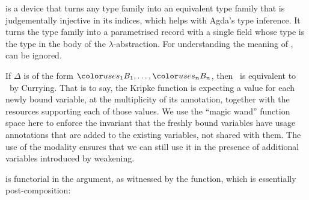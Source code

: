 



is a device that turns any type family into an equivalent type family
that is judgementally injective in its indices, which helps with
Agda's type inference.
It turns the type family into a parametrised
record with a single field  whose type is the type in
the body of the $\lambda$-abstraction.
For understanding the meaning of
,  can be ignored.

If $\Delta$ is of the form $\gr{s_1}B_1, \ldots, \gr{s_n}B_n$, then
\ is equivalent to
\ by Currying.  That is
to say, the Kripke function is expecting a value for each newly bound
variable, at the multiplicity of its annotation, together with the
resources supporting each of those values. We use the ``magic wand''
function space here to enforce the invariant that the freshly bound
variables have usage annotations that are added to the existing
variables, not shared with them. The use of the
 modality ensures that we can still use it in
the presence of additional variables introduced by weakening.

 is functorial in the \AgdaBound{$\C$} argument,
as witnessed by the  function, which is essentially
post-composition:




